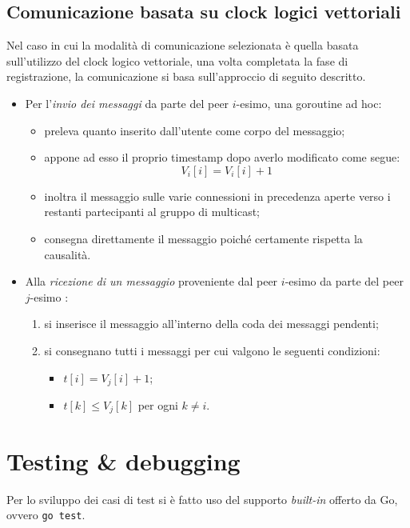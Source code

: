 \documentclass[conference]{IEEEtran}
\begin{document}
\subsection{Comunicazione basata su clock logici vettoriali}
Nel caso in cui la modalità di comunicazione selezionata è quella basata sull'utilizzo del clock logico vettoriale, una volta completata la fase di registrazione, la comunicazione si basa sull'approccio di seguito descritto.
\begin{itemize}
\item Per l'\textsl{invio dei messaggi} da parte del peer $i$-esimo, una goroutine ad hoc:
\begin{itemize}
\item preleva quanto inserito dall'utente come corpo del messaggio;
\item appone ad esso il proprio timestamp dopo averlo modificato come segue:
\begin{equation}
V_i[i] = V_i[i] + 1
\end{equation}
\item inoltra il messaggio sulle varie connessioni in precedenza aperte verso i restanti partecipanti al gruppo di multicast;
\item consegna direttamente il messaggio poiché certamente rispetta la causalità.
\end{itemize}

\item Alla \textsl{ricezione di un messaggio} proveniente dal peer $i$-esimo da parte del peer $j$-esimo :
\begin{enumerate}
\item si inserisce il messaggio all'interno della coda dei messaggi pendenti;
\item si consegnano tutti i messaggi per cui valgono le seguenti condizioni:
\begin{itemize}
\item $t[i] = V_j[i] + 1$;
\item $t[k] \leq V_j[k]$ per ogni $k\neq i$.
\end{itemize}
\end{enumerate}
\end{itemize}

\section{Testing \& debugging}
Per lo sviluppo dei casi di test si è fatto uso del supporto \textit{built-in} offerto da Go, ovvero \texttt{go test}.
\end{document}
